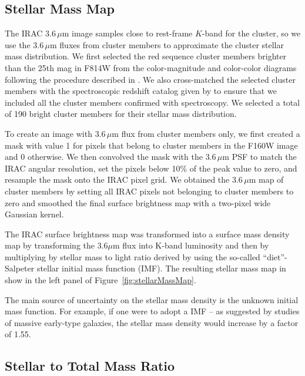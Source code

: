 \subsection{Stellar Mass Map}

The \spitzer IRAC $3.6\,\mu$m image samples close to rest-frame
$K$-band for the cluster, so we use the $3.6\,\mu$m fluxes from
cluster members to approximate the cluster stellar mass
distribution. We first selected the red sequence cluster members
brighter than the 25th mag in F814W from the color-magnitude and
color-color diagrams following the procedure described in
\cite{2014MNRAS.444..268R}. We also cross-matched the selected cluster
members with the spectroscopic redshift catalog given by
\citet{Owers:2011ez} to ensure that we included all the cluster
members confirmed with spectroscopy.  We selected a total of 190
bright cluster members for their stellar mass distribution.

To create an image with $3.6\,\mu$m flux from cluster members only, we
first created a mask with value 1 for pixels that belong to cluster
members in the F160W image and 0 otherwise. We then convolved the mask
with the $3.6\,\mu$m PSF to match the IRAC angular resolution, set the
pixels below 10\% of the peak value to zero, and resample the mask
onto the IRAC pixel grid. We obtained the $3.6\,\mu$m map of cluster
members by setting all IRAC pixels not belonging to cluster members to
zero and smoothed the final surface brightness map with a two-pixel
wide Gaussian kernel.

The IRAC surface brightness map was transformed into a surface mass
density map by transforming the 3.6$\mu$m flux into K-band luminosity
and then by multiplying by stellar mass to light ratio derived by
\cite{B+d01} using the so-called ``diet''-Salpeter stellar initial 
mass function (IMF). The resulting stellar mass map in show in the
left panel of Figure~\ref{fig:stellarMassMap}.

The main source of uncertainty on the stellar mass density is the
unknown initial mass function. For example, if one were to adopt a
\cite{Sal55} IMF -- as suggested by studies of massive early-type
galaxies, the stellar mass density would increase by a factor of 1.55.

\subsection{Stellar to Total Mass Ratio}

